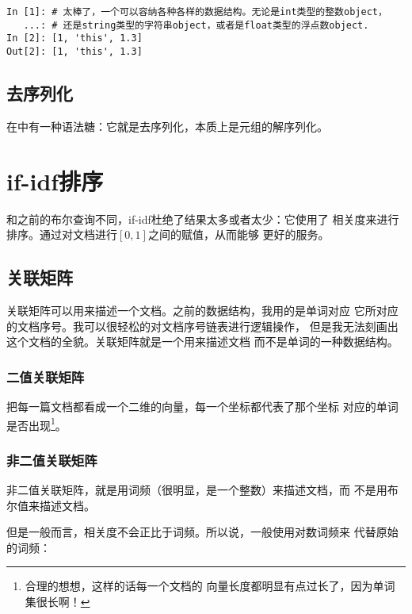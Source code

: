 \begin{lstlisting}
In [1]: # 太棒了，一个可以容纳各种各样的数据结构。无论是int类型的整数object，
   ...: # 还是string类型的字符串object，或者是float类型的浮点数object.
In [2]: [1, 'this', 1.3]
Out[2]: [1, 'this', 1.3]
\end{lstlisting}

\subsection{去序列化}

在\pyth 中有一种语法糖：它就是去序列化，本质上是元组的解序列化。


\section{if-idf排序}

和之前的布尔查询不同，if-idf杜绝了结果太多或者太少：它使用了
相关度来进行排序。通过对文档进行$[0,1]$之间的赋值，从而能够
更好的服务。

\subsection{关联矩阵}

关联矩阵可以用来描述一个文档。之前的数据结构，我用的是单词对应
它所对应的文档序号。我可以很轻松的对文档序号链表进行逻辑操作，
但是我无法刻画出这个文档的全貌。关联矩阵就是一个用来描述文档
而不是单词的一种数据结构。

\subsubsection{二值关联矩阵}

把每一篇文档都看成一个二维的向量，每一个坐标都代表了那个坐标
对应的单词是否出现\footnote{合理的想想，这样的话每一个文档的
向量长度都明显有点过长了，因为单词集很长啊！}。

\subsubsection{非二值关联矩阵}
\label{sec 非二值}

非二值关联矩阵，就是用词频（很明显，是一个整数）来描述文档，而
不是用布尔值来描述文档。

但是一般而言，相关度不会正比于词频。所以说，一般使用对数词频来
代替原始的词频：

